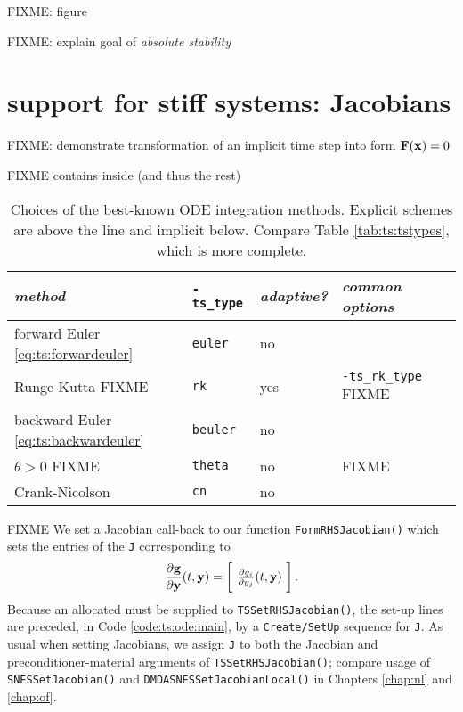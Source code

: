 FIXME: figure

FIXME: explain goal of \emph{absolute stability}

\section{\pTS support for stiff systems: Jacobians}   FIXME: demonstrate transformation of an implicit time step into form $\mathbf{F}(\mathbf{x})=0$

FIXME \pTS contains \pSNES inside (and thus the rest)

\begin{table}
\small
\begin{tabular}{lllll}
\emph{method}                                & \texttt{-ts\_type} & \emph{adaptive?} & \emph{common options} \\ \hline
forward Euler \eqref{eq:ts:forwardeuler}    & \texttt{euler}  & no & \\
Runge-Kutta  FIXME                          & \texttt{rk}     & yes & \texttt{-ts\_rk\_type} FIXME \\ \hline
backward Euler \eqref{eq:ts:backwardeuler}  & \texttt{beuler} & no & \\
$\theta>0$   FIXME                          & \texttt{theta}  & no & FIXME \\
Crank-Nicolson                              & \texttt{cn}     & no & 
\end{tabular}
\caption{Choices of the best-known ODE integration methods.  Explicit schemes are above the line and implicit below.  Compare Table \ref{tab:ts:tstypes}, which is more complete.} \label{tab:ts:odebasictypes}
\end{table}

FIXME We set a Jacobian call-back to our function \texttt{FormRHSJacobian()} which sets the entries of the \pMat \texttt{J} corresponding to
    $$\frac{\partial \mathbf{g}}{\partial \mathbf{y}}(t,\mathbf{y}) = \begin{bmatrix}\phantom{\bigg|} \frac{\partial g_i}{\partial y_j}(t,\mathbf{y}) \phantom{\bigg|}\end{bmatrix}.$$
Because an allocated \pMat must be supplied to \texttt{TSSetRHSJacobian()}, the \pTS set-up lines are preceded, in Code \ref{code:ts:ode:main}, by a \texttt{Create/SetUp} sequence for \pMat \texttt{J}.  As usual when setting Jacobians, we assign \texttt{J} to both the Jacobian and preconditioner-material arguments of \texttt{TSSetRHSJacobian()}; compare usage of \texttt{SNESSetJacobian()} and \texttt{DMDASNESSetJacobianLocal()} in Chapters \ref{chap:nl} and \ref{chap:of}.

